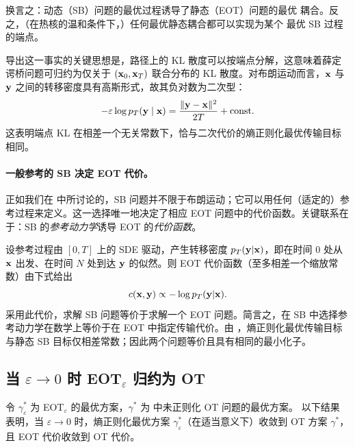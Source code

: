 换言之：动态（SB）问题的最优过程诱导了静态（EOT）问题的最优
耦合。反之，（在热核的温和条件下，）任何最优静态耦合都可以实现为某个
最优 SB 过程的端点。

导出这一事实的关键思想是，路径上的 KL 散度可以按端点分解，这意味着薛定谔桥问题可归约为仅关于 $({\mathbf{x}}_0,{\mathbf{x}}_T)$ 联合分布的 KL 散度。对布朗运动而言，${\mathbf{x}}$ 与 ${\mathbf{y}}$ 之间的转移密度具有高斯形式，故其负对数为二次型：
\[
-\varepsilon\log p_T({\mathbf{y}}\mid{\mathbf{x}})=\frac{\|{\mathbf{y}}-{\mathbf{x}}\|^2}{2T}+\text{const}.
\]
这表明端点 KL 在相差一个无关常数下，恰与二次代价的熵正则化最优传输目标相同。


\paragraph{一般参考的 SB 决定 EOT 代价。}
正如我们在  中所讨论的，SB 问题并不限于布朗运动；它可以用任何（适定的）参考过程来定义。这一选择唯一地决定了相应 EOT 问题中的代价函数。关键联系在于：SB 的\emph{参考动力学}诱导 EOT 的\emph{代价函数}。

设参考过程由 $[0,T]$ 上的 SDE 驱动，产生转移密度 $p_T({\mathbf{y}}|{\mathbf{x}})$，即在时间 $0$ 处从 ${\mathbf{x}}$ 出发、在时间 $N$ 处到达 ${\mathbf{y}}$ 的似然。则 EOT 代价函数（至多相差一个缩放常数）由下式给出
\[
c({\mathbf{x}}, {\mathbf{y}}) \propto -\log p_T({\mathbf{y}}|{\mathbf{x}}).
\]
采用此代价，求解 SB 问题等价于求解一个 EOT 问题。简言之，在 SB 中选择参考动力学在数学上等价于在 EOT 中指定传输代价。由 ，熵正则化最优传输目标与静态 SB 目标仅相差常数；因此两个问题等价且具有相同的最小化子。




\subsection{当 $\varepsilon\to 0$ 时 EOT$_\varepsilon$ 归约为 OT}\label{subsec:eot-ot}


令 $\gamma^*_\varepsilon$ 为 EOT$_\varepsilon$ 的最优方案，$\gamma^*$ 为  中未正则化 OT 问题的最优方案。  以下结果~\citep{mikami2008optimal, peyre2019computational} 表明，当 $\varepsilon \to 0$ 时，熵正则化最优方案 $\gamma^*_\varepsilon$（在适当意义下）收敛到 OT 方案 $\gamma^*$，且 EOT 代价收敛到 OT 代价。 



